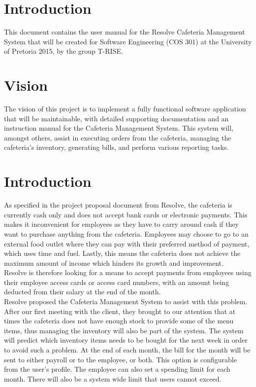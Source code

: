 \documentclass[a4paper,12pt]{article}
\begin{document}
\pagebreak

\section{Introduction}
This document contains the user manual for the Resolve Cafeteria Management System that will be created for Software Engineering (COS 301) at the University of Pretoria 2015, by the group T-RISE. 

\section{Vision}
The vision of this project is to implement a fully functional software application that will be maintainable, with detailed supporting documentation and an instruction manual for the Cafeteria Management System. This system will, amongst others, assist in executing orders from the cafeteria, managing the cafeteria's inventory, generating bills, and perform various reporting tasks. 

\section{Introduction}
As specified in the project proposal document from Resolve, the cafeteria is currently cash only and does not accept bank cards or electronic payments. This makes it inconvenient for employees as they have to carry around cash if they want to purchase anything from the cafeteria. Employees may choose to go to an external food outlet where they can pay with their preferred method of payment, which uses time and fuel. Lastly, this means the cafeteria does not achieve the maximum amount of income which hinders its growth and improvement.\\

Resolve is therefore looking for a means to accept payments from employees  using their employee access cards or access card numbers, with an amount being deducted from their salary at the end of the month.\\

Resolve proposed the Cafeteria Management System to assist with this problem.
After our first meeting with the client, they brought to our attention that at times the cafeteria does not have enough stock to provide some of the menu items, thus managing the inventory will also be part of the system. The system will predict which inventory items needs to be bought for the next week in order to avoid such a problem. At the end of each month, the bill for the month will be sent to either payroll or to the employee, or both. This option is configurable from the user's profile. The employee can also set a spending limit for each month. There will also be a system wide limit that users cannot exceed.
\end{document}
